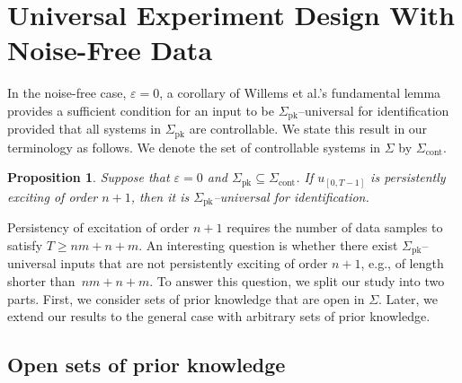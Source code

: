 \documentclass[journal,twoside,web]{ieeecolor}
\newtheorem{proposition}[theorem]{Proposition}
\begin{document}
%

%

%

\section{Universal Experiment Design With Noise-Free Data}
\label{sec:UED_noisefree}

In the noise-free case, $\varepsilon=0$, a corollary of Willems et al.'s fundamental lemma \cite[Cor. 2]{willems2005note} provides a sufficient condition for an input to be $\Sigma_\text{pk}$--universal for identification provided that all systems in $\Sigma_\text{pk}$ are controllable. We state this result in our terminology as follows. We denote the set of controllable systems in $\Sigma$ by $\Sigma_\text{cont}$.
\begin{proposition}
\label{prop:Willems}
Suppose that \mbox{$\varepsilon=0$} and $\Sigma_\text{pk}\subseteq\Sigma_\text{cont}$. If $u_{[0,T-1]}$ is persistently exciting of order $n+1$, then it is \mbox{$\Sigma_\text{pk}$--universal} for identification. 
\end{proposition}

Persistency of excitation of order $n+1$ requires the number of data samples to satisfy $T\geq nm+n+m$. An interesting question is whether there exist \mbox{$\Sigma_\text{pk}$--universal} inputs that are not persistently exciting of order $n+1$, e.g., of length shorter \mbox{than $nm+n+m$}. To answer this question, we split our study into two parts. First, we consider sets of prior knowledge that are open in $\Sigma$. Later, we extend our results to the general case with arbitrary sets of prior knowledge.

\subsection{Open sets of prior knowledge}
\label{sec:noise-free_open}
\end{document}
